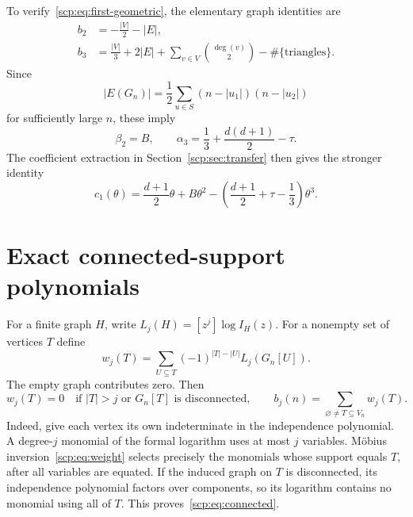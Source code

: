 \documentclass[11pt]{article}
\begin{document}
To verify~\eqref{scp:eq:first-geometric}, the elementary graph identities are
\begin{align*}
 b_2&=-\frac{|V|}{2}-|E|,\\
 b_3&=\frac{|V|}{3}+2|E|+\sum_{v\in V}\binom{\deg(v)}2
       -\#\{\text{triangles}\}.
\end{align*}
Since
\[
 |E(G_n)|=\frac12\sum_{u\in S}(n-|u_1|)(n-|u_2|)
\]
for sufficiently large $n$, these imply
\begin{equation}\label{scp:eq:first-clusters}
 \beta_2=B,\qquad
 \alpha_3=\frac13+\frac{d(d+1)}2-\tau.
\end{equation}
The coefficient extraction in Section~\ref{scp:sec:transfer} then gives the stronger identity
\begin{equation}\label{scp:eq:c1theta}
 c_1(\theta)=\frac{d+1}{2}\theta+B\theta^2
 -\left(\frac{d+1}{2}+\tau-\frac13\right)\theta^3.
\end{equation}

\section{Exact connected-support polynomials}\label{scp:sec:connected}
For a finite graph $H$, write $L_j(H)=[z^j]\log I_H(z)$. For a nonempty set of vertices $T$ define
\begin{equation}\label{scp:eq:weight}
 w_j(T)=\sum_{U\subseteq T}(-1)^{|T|-|U|}L_j(G_n[U]).
\end{equation}
The empty graph contributes zero. Then
\begin{equation}\label{scp:eq:connected}
 w_j(T)=0\quad\text{if }|T|>j\text{ or }G_n[T]\text{ is disconnected},
 \qquad b_j(n)=\sum_{\varnothing\ne T\subseteq V_n}w_j(T).
\end{equation}
Indeed, give each vertex its own indeterminate in the independence polynomial. A degree-$j$ monomial of the formal logarithm uses at most $j$ variables. M\"obius inversion~\eqref{scp:eq:weight} selects precisely the monomials whose support equals $T$, after all variables are equated. If the induced graph on $T$ is disconnected, its independence polynomial factors over components, so its logarithm contains no monomial using all of $T$. This proves~\eqref{scp:eq:connected}.
\end{document}
